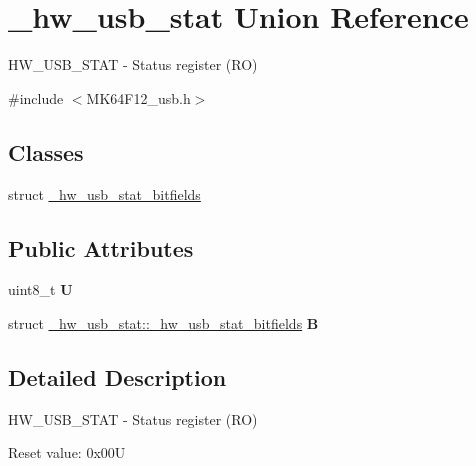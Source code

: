 \hypertarget{union__hw__usb__stat}{}\section{\+\_\+hw\+\_\+usb\+\_\+stat Union Reference}
\label{union__hw__usb__stat}


H\+W\+\_\+\+U\+S\+B\+\_\+\+S\+T\+AT -\/ Status register (RO)  




{\ttfamily \#include $<$M\+K64\+F12\+\_\+usb.\+h$>$}

\subsection*{Classes}
\begin{DoxyCompactItemize}
\item 
struct \hyperlink{struct__hw__usb__stat_1_1__hw__usb__stat__bitfields}{\+\_\+hw\+\_\+usb\+\_\+stat\+\_\+bitfields}
\end{DoxyCompactItemize}
\subsection*{Public Attributes}
\begin{DoxyCompactItemize}
\item 
uint8\+\_\+t {\bfseries U}\hypertarget{union__hw__usb__stat_abc56c14a713e2fd65af213622e2fc52c}{}\label{union__hw__usb__stat_abc56c14a713e2fd65af213622e2fc52c}

\item 
struct \hyperlink{struct__hw__usb__stat_1_1__hw__usb__stat__bitfields}{\+\_\+hw\+\_\+usb\+\_\+stat\+::\+\_\+hw\+\_\+usb\+\_\+stat\+\_\+bitfields} {\bfseries B}\hypertarget{union__hw__usb__stat_a45a563d91f69d4823c7e4cf268a3902b}{}\label{union__hw__usb__stat_a45a563d91f69d4823c7e4cf268a3902b}

\end{DoxyCompactItemize}


\subsection{Detailed Description}
H\+W\+\_\+\+U\+S\+B\+\_\+\+S\+T\+AT -\/ Status register (RO) 

Reset value\+: 0x00U

